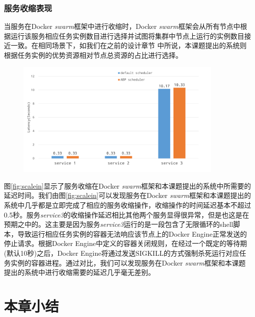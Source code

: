 \subsubsection{服务收缩表现}\label{sec:scalein}

当服务在Docker \emph{swarm}框架中进行收缩时，Docker \emph{swarm}框架会从所有节点中根据运行该服务相应任务实例数目进行选择并试图将集群中节点上运行的实例数目接近一致。在相同场景下，如我们在之前的设计章节%
中所说，本课题提出的系统则根据任务实例的优势资源相对节点总资源的占比进行选择。

\begin{figure}[htbp]
\centering
\includegraphics[width=0.9\textwidth]{./figure/scalein}
\end{figure}

图\ref{fig:scalein}显示了服务收缩在Docker \emph{swarm}框架和本课题提出的系统中所需要的延迟时间。我们由图\ref{fig:scalein}可以发现服务在Docker \emph{swarm}框架和本课题提出的系统中几乎都是立即完成了相应的服务收缩操作，收缩操作的时间延迟基本不超过0.5秒。服务\emph{service3}的收缩操作延迟相比其他两个服务显得很异常，但是也这是在预期之中的。这主要是因为服务\emph{service3}运行的是一段包含了无限循环的shell脚本，导致运行相应任务实例的容器无法响应该节点上的Docker Engine正常发送的停止请求。根据Docker Engine中定义的容器关闭规则，在经过一个既定的等待期(默认10秒)之后，Docker Engine将通过发送SIGKILL的方式强制杀死运行对应任务实例的容器进程。通过对比，我们可以发现服务在Docker \emph{swarm}框架和本课题提出的系统中进行收缩需要的延迟几乎毫无差别。

\section{本章小结}


